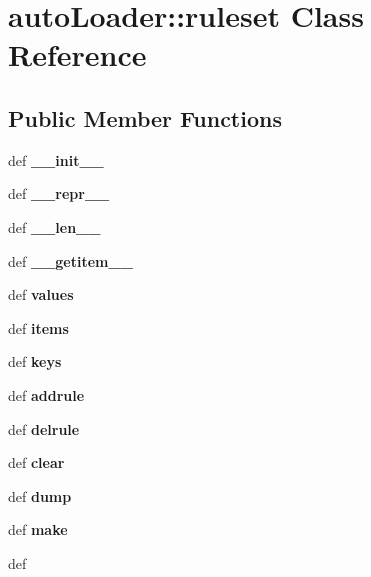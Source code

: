 \section{auto\-Loader::ruleset Class Reference}
\label{classautoLoader_1_1ruleset}
\subsection*{Public Member Functions}
\begin{CompactItemize}
\item 
def \textbf{\_\-\_\-init\_\-\_\-}\label{classautoLoader_1_1ruleset_2e35d6492012d915a47cdf6ef31af7e8}

\item 
def \textbf{\_\-\_\-repr\_\-\_\-}\label{classautoLoader_1_1ruleset_a06e4ba92b63e8d0d3d56a8cda858f51}

\item 
def \textbf{\_\-\_\-len\_\-\_\-}\label{classautoLoader_1_1ruleset_79b13876449876ec74a06ba53087031f}

\item 
def \textbf{\_\-\_\-getitem\_\-\_\-}\label{classautoLoader_1_1ruleset_0eb6f28c4ca9e56998e22f731cc0adeb}

\item 
def \textbf{values}\label{classautoLoader_1_1ruleset_659d103c347f70748e96791edcc5fda4}

\item 
def \textbf{items}\label{classautoLoader_1_1ruleset_89d2c29e0e429e18048b99cda36b1fa7}

\item 
def \textbf{keys}\label{classautoLoader_1_1ruleset_a3934f141af7bed09907b58972b32c71}

\item 
def \textbf{addrule}\label{classautoLoader_1_1ruleset_5e2e8ca2e156e6e9454105acdf4b5925}

\item 
def \textbf{delrule}\label{classautoLoader_1_1ruleset_f722b9115b36800caf60def5b6439e9a}

\item 
def \textbf{clear}\label{classautoLoader_1_1ruleset_bd371dbacdadf326cc55a750d3043fd9}

\item 
def \textbf{dump}\label{classautoLoader_1_1ruleset_849dd01cbc9bb0b4c8b7a7f15577a4c5}

\item 
def \textbf{make}\label{classautoLoader_1_1ruleset_99a5a464b6460ee3be5611d132d3898d}

\item 
def {\bfrun}
\end{CompactItemize}
